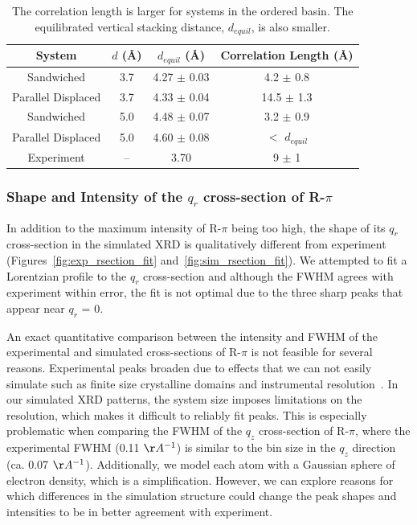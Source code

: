 \documentclass[journal=jpcbfk,manuscript=article]{achemso}
\begin{document}
  \begin{table}[h]
  \centering
  \begin{tabular}{cccc}
  \toprule
  System             & $\mathit{d}$ (\AA) & $\mathit{d}_{equil}$ (\AA) & Correlation Length (\AA) \\
  \midrule
  Sandwiched         & 3.7                &    4.27 $\pm$ 0.03         & 4.2 $\pm$ 0.8            \\
  Parallel Displaced & 3.7                &    4.33 $\pm$ 0.04         & 14.5 $\pm$ 1.3           \\ 
  Sandwiched         & 5.0                &    4.48 $\pm$ 0.07         & 3.2 $\pm$ 0.9            \\
  Parallel Displaced & 5.0                &    4.60 $\pm$ 0.08         & $<$ $d_{equil}$ \\ 
  Experiment         & --                 &    3.70                    & 9 $\pm$ 1               \\
  \bottomrule
  \end{tabular}
  \caption{The correlation length is larger for systems in the ordered basin.
	  The equilibrated vertical stacking distance, $\mathit{d}_{equil}$, is also
	  smaller.}
  \label{table:correlation_length}
  \end{table}

  \subsubsection*{Shape and Intensity of the $q_r$ cross-section of R-$\pi$}

  In addition to the maximum intensity of R-$\pi$ being too high, the shape
  of its $q_r$ cross-section in the simulated XRD is qualitatively different
  from experiment (Figures~\ref{fig:exp_rsection_fit}
  and~\ref{fig:sim_rsection_fit}). We attempted to fit a Lorentzian profile to 
  the $q_r$ cross-section and although the FWHM agrees with experiment within
  error, the fit is not optimal due to the three sharp peaks that appear near
  $q_r$ = 0. 
  
  An exact quantitative comparison between the intensity and FWHM of the
  experimental and simulated cross-sections of R-$\pi$ is not feasible for
  several reasons. Experimental peaks broaden due to effects that we can not
  easily simulate such as finite size crystalline domains and instrumental %
  resolution~\cite{girolami_x-ray_2016}. In our simulated XRD patterns, 
  the system size imposes limitations
  on the resolution, which makes it difficult to reliably fit peaks. This is
  especially problematic when comparing the FWHM of the $q_z$ cross-section of
  R-$\pi$, where the experimental FWHM (0.11 $\AA^{-1}$) is similar to the bin
  size in the $q_z$ direction (ca. 0.07 $\AA^{-1}$).  Additionally, we model each
  atom with a Gaussian sphere of electron density, which is a simplification.
  However, we can explore reasons for which differences in the simulation
  structure could change the peak shapes and intensities to be in better
  agreement with experiment.
   
\end{document}
